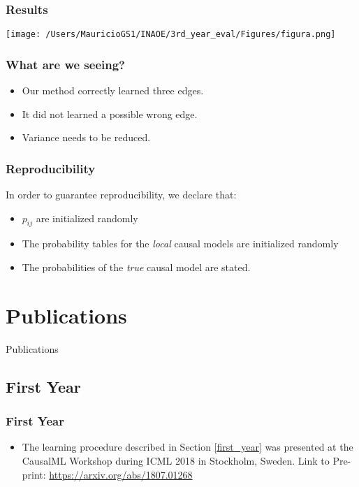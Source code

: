 \documentclass{beamer}
\theoremstyle{plain}
\begin{document}
\begin{frame}
\frametitle{Results}
\texttt{[image: /Users/MauricioGS1/INAOE/3rd\_year\_eval/Figures/figura.png]}
\end{frame}

\begin{frame}
\frametitle{What are we seeing?}
\begin{itemize}
\item Our method correctly learned three edges.
\item It did not learned a possible wrong edge. 
\item Variance needs to be reduced. 
\end{itemize}
\end{frame}

\begin{frame}
\frametitle{Reproducibility}
In order to guarantee reproducibility, we declare that:
\begin{itemize}
\item $p_{ij}$ are initialized randomly
\item The probability tables for the \textit{local} causal models are initialized randomly
\item The probabilities of the \textit{true} causal model are stated. 
\end{itemize}
\end{frame}

\section{Publications}
\begin{frame}
\begin{center}
\LARGE{Publications}
\end{center}
\end{frame}

\subsection{First Year}
\begin{frame}
\frametitle{First Year}
\begin{itemize}
\item The learning procedure described in Section \ref{first_year} was presented at the CausalML Workshop during ICML 2018 in Stockholm, Sweden. Link to Pre-print: \url{https://arxiv.org/abs/1807.01268}
\end{itemize}
\end{frame}
\end{document}
